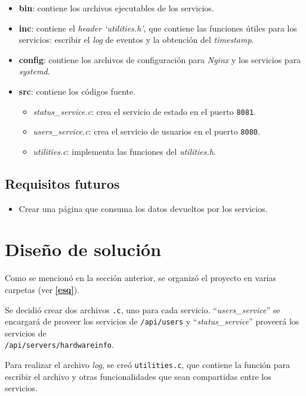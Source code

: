 \documentclass[12pt,a4paper]{article}
\begin{document}
\begin{itemize}[leftmargin=1.5cm]
  \item \textbf{bin}: contiene los archivos ejecutables de los servicios.
  \item \textbf{inc}: contiene el \emph{header `utilities.h'}, que contiene las
  funciones útiles para los servicios: escribir el \emph{log} de eventos y la
  obtención del \emph{timestamp}.
  \item \textbf{config}: contiene los archivos de configuración para \emph{Nginx}
  y los servicios para \emph{systemd}.
  \item \textbf{src}: contiene los códigos fuente.

  \begin{itemize}[leftmargin=1cm, nosep]
    \item \emph{status\_service.c}: crea el servicio de estado en el puerto \verb|8081|.
    \item \emph{users\_service.c}: crea el servicio de usuarios en el puerto \verb|8080|.
    \item \emph{utilities.c}: implementa las funciones del \emph{utilities.h}.
  \end{itemize}
\end{itemize}

\subsection{Requisitos futuros}
\label{futurereq}

\begin{itemize}[leftmargin=1.5cm]
  \item Crear una página que consuma los datos devueltos por los servicios.
\end{itemize}


\section{Diseño de solución}
\label{solucion}
Como se mencionó en la sección anterior, se organizó el proyecto en varias
carpetas (ver \textbf{\ref{esq}}).

Se decidió crear dos archivos \verb|.c|, uno para cada servicio.
``\emph{users\_service}'' se encargará de proveer los servicios de \verb|/api/users|
y ``\emph{status\_service}'' proveerá los servicios de \\
\verb|/api/servers/hardwareinfo|.

Para realizar el archivo \emph{log}, se creó \verb|utilities.c|, que contiene la
función para escribir el archivo y otras funcionalidades que sean compartidas
entre los servicios.
\end{document}
